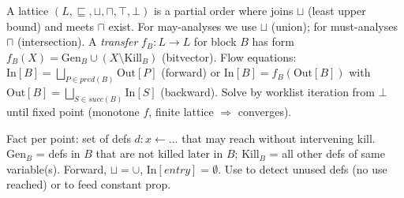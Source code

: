 \begin{definition}
A lattice $(L,\sqsubseteq,\sqcup,\sqcap,\top,\bot)$ is a partial order where joins $\sqcup$ (least upper bound) and meets $\sqcap$ exist. For may-analyses we use $\sqcup$ (union); for must-analyses $\sqcap$ (intersection). A \emph{transfer} $f_B: L\to L$ for block $B$ has form $f_B(X)=\text{Gen}_B\cup(X\setminus\text{Kill}_B)$ (bitvector). Flow equations: $\text{In}[B]=\bigsqcup_{P\in pred(B)}\text{Out}[P]$ (forward) or $\text{In}[B]=f_B(\text{Out}[B])$ with $\text{Out}[B]=\bigsqcup_{S\in succ(B)}\text{In}[S]$ (backward). Solve by worklist iteration from $\bot$ until fixed point (monotone $f$, finite lattice $\Rightarrow$ converges).
\end{definition}

\begin{example}
Fact per point: set of defs $d: x\gets\dots$ that may reach without intervening kill. $\text{Gen}_B$ = defs in $B$ that are not killed later in $B$; $\text{Kill}_B$ = all other defs of same variable(s). Forward, $\sqcup=\cup$, $\text{In}[entry]=\emptyset$. Use to detect unused defs (no use reached) or to feed constant prop.
\end{example}

